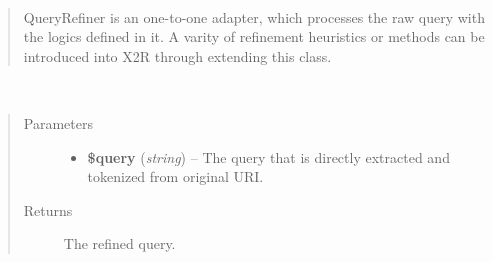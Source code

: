\documentclass[letterpaper,10pt,english]{sphinxmanual}
\begin{document}
\begin{fulllineitems}
\label{docs/api:QueryRefiner}~\begin{quote}

QueryRefiner is an one-to-one adapter, which processes the raw query with the logics defined in it. A varity of refinement heuristics or methods can be introduced into X2R through extending this class.
\end{quote}

\begin{fulllineitems}
\label{docs/api:QueryRefiner::refine}~\begin{quote}\begin{description}
\item[{Parameters}] \leavevmode\begin{itemize}
\item {} 
\textbf{\$query} (\emph{string}) -- The query that is directly extracted and tokenized from original URI.

\end{itemize}

\item[{Returns}] \leavevmode
The refined query.

\end{description}\end{quote}

\end{fulllineitems}


\end{fulllineitems}

\end{document}
